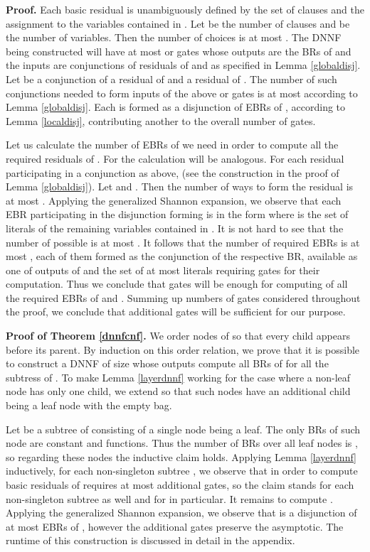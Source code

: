 \documentclass{llncs}
\begin{document}
{\bf Proof.}
Each basic residual  is unambiguously defined by the set of clauses 
and  the assignment  to the variables contained in . Let  be the number of clauses
and  be the number of variables. Then the number of choices is at most .
The DNNF being constructed will have at most  {\sc or} gates whose outputs are the BRs of  
and the inputs are conjunctions of residuals of  and  as specified in
Lemma \ref{globaldisj}.  
Let  be a conjunction of a residual of  and a residual of . The number 
of such conjunctions needed to form inputs of the above {\sc or} gates is at most  according to 
Lemma \ref{globaldisj}. Each  is formed as a disjunction of EBRs of , according to Lemma 
\ref{localdisj}, contributing another  to the overall number of gates.
 
Let us calculate the number of EBRs of  we need in order to compute
all the required residuals of . For  the calculation will be analogous.
For each residual  participating in a conjunction  as above, 
 (see the construction
in the proof of Lemma \ref{globaldisj}). Let  and .
Then the number of ways to form the residual is at most . 
Applying the generalized Shannon expansion, we observe that each EBR
participating in the disjunction forming  is in the form
 where  is the set of literals of the remaining 
variables contained in . It is not hard to see that the number of possible 
is at most . It follows that the number of required EBRs is at most , each of them
formed as the conjunction of the respective BR, available as one of outputs of  and the set of at most 
literals requiring  gates for their computation. Thus we conclude that  gates will be enough for computing  
of all the required EBRs of  and .
Summing up numbers of gates considered throughout the proof, we conclude
that  additional gates will be sufficient for our purpose. 

{\bf Proof of Theorem \ref{dnnfcnf}.}
We order nodes of  so that every child appears before
its parent. By induction on this order relation, we prove that it is possible to construct
a DNNF of size  whose outputs compute all BRs of  for all the subtress
 of . To make Lemma \ref{layerdnnf} working for 
the case where a non-leaf node has only one child, we extend  so that such nodes have 
an additional child being a leaf node with the empty bag.

Let  be a subtree of  consisting of a single node being a leaf.
The only BRs of such node are constant  and  functions. Thus
the number of BRs over all leaf nodes is , so regarding these nodes the inductive claim
holds. Applying Lemma \ref{layerdnnf} inductively, for each non-singleton subtree , we observe that
in order to compute basic residuals of  requires at most  additional gates, so the claim stands
for each non-singleton subtree  as well and for  in particular. It remains to compute .
Applying the generalized Shannon expansion, we observe that  is a disjunction of at most  EBRs of
 , however the additional  gates preserve the asymptotic.  
The runtime of this construction is discussed in detail in the appendix. 
\end{document}
